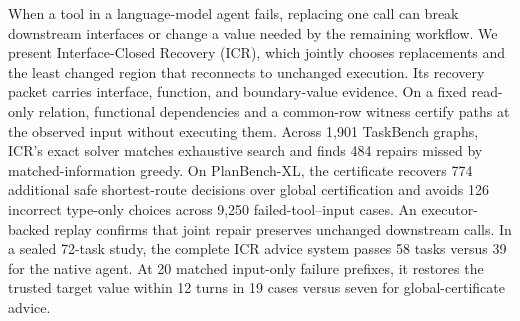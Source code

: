 When a tool in a language-model agent fails, replacing one call can break
downstream interfaces or change a value needed by the remaining workflow. We
present Interface-Closed Recovery (ICR), which jointly chooses replacements
and the least changed region that reconnects to unchanged execution. Its
recovery packet carries interface, function, and boundary-value evidence. On
a fixed read-only relation, functional dependencies and a common-row witness
certify paths at the observed input without executing them. Across 1,901
TaskBench graphs, ICR's exact solver matches exhaustive search and finds 484
repairs missed by matched-information greedy. On PlanBench-XL, the certificate
recovers 774 additional safe shortest-route decisions over global certification
and avoids 126 incorrect type-only choices across 9,250 failed-tool--input
cases. An executor-backed replay confirms that joint repair preserves unchanged
downstream calls. In a sealed 72-task study, the complete ICR advice system
passes 58 tasks versus 39 for the native agent. At 20 matched input-only
failure prefixes, it restores the trusted target value within 12 turns in 19
cases versus seven for global-certificate advice.
